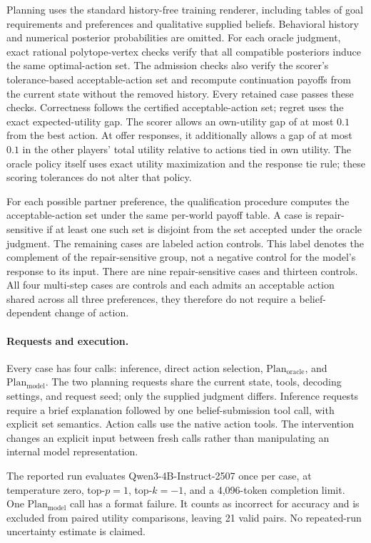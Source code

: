 Planning uses the standard history-free training renderer, including tables
of goal requirements and preferences and qualitative supplied beliefs.
Behavioral history and numerical posterior probabilities are omitted.
For each oracle judgment, exact rational polytope-vertex checks verify that
all compatible posteriors induce the same optimal-action set. The admission
checks also verify the scorer's tolerance-based acceptable-action set and
recompute continuation payoffs from the current state without the removed
history. Every retained case passes these checks. Correctness follows the
certified acceptable-action set; regret uses the exact expected-utility gap.
The scorer allows an own-utility gap of at most $0.1$ from the best action.
At offer responses, it additionally allows a gap of at most $0.1$ in the
other players' total utility relative to actions tied in own utility.
The oracle policy itself uses exact utility maximization and the response
tie rule; these scoring tolerances do not alter that policy.

For each possible partner preference, the qualification procedure computes
the acceptable-action set under the same per-world payoff table. A case is
repair-sensitive if at least one such set is disjoint from the set accepted
under the oracle judgment. The remaining cases are labeled action
controls. This label denotes the complement of the
repair-sensitive group, not a negative control for the model's response to
its input. There are nine repair-sensitive cases and thirteen controls.
All four multi-step cases are controls and each admits an acceptable action
shared across all three preferences, they therefore do not require a
belief-dependent change of action.

\paragraph{Requests and execution.}
Every case has four calls: inference, direct action selection,
$\mathrm{Plan}_{\mathrm{oracle}}$, and $\mathrm{Plan}_{\mathrm{model}}$.
The two planning requests share the current state, tools, decoding settings,
and request seed; only the supplied judgment differs. Inference requests require a
brief explanation followed by one belief-submission tool call, with explicit
set semantics. Action calls use the native action tools. The intervention
changes an explicit input between fresh calls rather than manipulating an
internal model representation.

The reported run evaluates Qwen3-4B-Instruct-2507 once per case, at temperature
zero, top-$p=1$, top-$k=-1$, and a 4,096-token completion limit. One $\mathrm{Plan}_{\mathrm{model}}$ call has a
format failure. It counts as incorrect for accuracy and is excluded from
paired utility comparisons, leaving 21 valid pairs. No repeated-run
uncertainty estimate is claimed.

